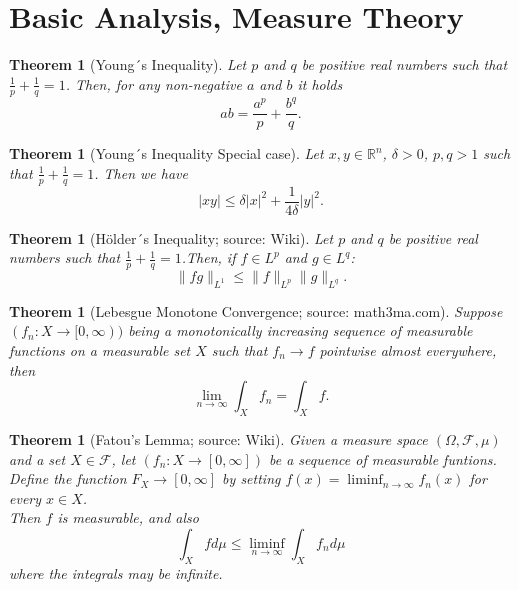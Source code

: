 \documentclass[12pt,a4paper]{article}
\newtheorem{thm}[definition]{Theorem}
\newcommand{\Rn}{\mathbb{R}^n}
\begin{document}
\section{Basic Analysis, Measure Theory}

\begin{thm}[Young´s Inequality]
Let $p$ and $q$ be positive real numbers such that $\frac{1}{p} + \frac{1}{q} = 1$. Then, for any non-negative $a$ and $b$ it holds
\begin{equation}
ab=\frac{a^p}{p}+\frac{b^q}{q}.
\end{equation}
\end{thm}

\begin{thm}[Young´s Inequality Special case]
Let $x,y\in \Rn$, $\delta > 0$, $p,q>1$ such that $\frac{1}{p} + \frac{1}{q} = 1$. Then we have
\begin{equation}
\vert xy\vert \leq \delta \vert x \vert^2 + \frac{1}{4\delta}\vert y \vert^2.
\end{equation}
\end{thm}

\begin{thm} [Hölder´s Inequality; source: Wiki]
Let $p$ and $q$ be positive real numbers such that $\frac{1}{p} + \frac{1}{q} = 1$.Then, if $f \in L^p$ and $g\in L^q$:
\begin{equation}
\lVert fg \rVert_{L^1} \leq \lVert f \rVert_{L^p} \lVert g \rVert_{L^q}.
\end{equation}
\end{thm}

\begin{thm}[Lebesgue Monotone Convergence; source: math3ma.com]
Suppose $(f_n:X\rightarrow [0,\infty))$ being a monotonically increasing sequence of measurable functions on a measurable set $X$ such that $f_n\rightarrow f$ pointwise almost everywhere, then
\begin{equation}
\lim_{n\rightarrow\infty} \int_X f_n = \int_X f.
\end{equation}
\end{thm}

\begin{thm}[Fatou's Lemma; source: Wiki]
Given a measure space $(\Omega, \mathcal{F}, \mu)$ and a set $X\in \mathcal{F}$, let $(f_n:X\rightarrow [0,\infty])$ be  a sequence of measurable funtions. Define the function $F_X\rightarrow[0,\infty]$ by setting $f(x)=\liminf_{n\rightarrow\infty} f_n(x)$ for every $x\in X$.\\
Then $f$ is measurable, and also
\begin{equation}
\int_X f d\mu \leq \liminf_{n\rightarrow \infty}\int_X f_n d\mu
\end{equation} 
where the integrals may be infinite.
\end{thm}
\end{document}
